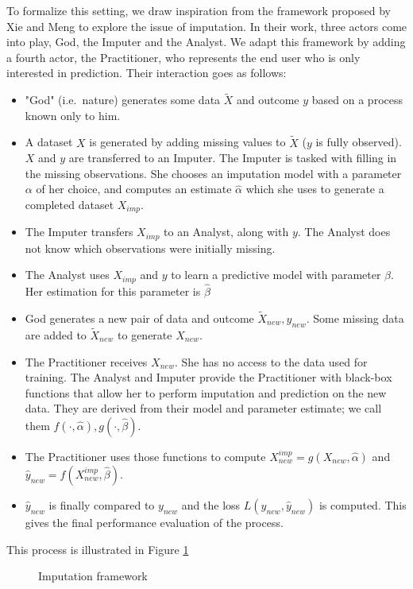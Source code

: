 To formalize this setting, we draw inspiration from the framework proposed by Xie and Meng \cite{xie2017framework} to explore the issue of imputation. In their work, three actors come into play, God, the Imputer and the Analyst. We adapt this framework by adding a fourth actor, the Practitioner, who represents the end user who is only interested in prediction. Their interaction goes as follows:
\begin{itemize}
 \item "God" (i.e.\ nature) generates some data $\tilde{X}$ and outcome $y$ based on a process known only to him. 
 \item A dataset $X$ is generated by adding missing values to $\tilde{X}$ ($y$ is fully observed). $X$ and $y$ are transferred to an Imputer. The Imputer is tasked with filling in the missing observations. She chooses an imputation model with a parameter $\alpha$ of her choice, and computes an estimate $\hat{\alpha}$ which she uses to generate a completed dataset $X_{imp}$.
 \item The Imputer transfers $X_{imp}$ to an Analyst, along with $y$. The Analyst does not know which observations were initially missing.
 \item The Analyst uses $X_{imp}$ and $y$ to learn a predictive model with parameter $\beta$. Her estimation for this parameter is $\hat{\beta}$
 \item God generates a new pair of data and outcome $\tilde{X}_{new}, y_{new}$. Some missing data are added to
 $\tilde{X}_{new}$ to generate $X_{new}$.
 \item The Practitioner receives $X_{new}$. She has no access to the data used for training. The Analyst and Imputer provide the Practitioner with black-box functions that allow her to perform imputation and prediction on the new data. They are derived from their model and parameter estimate; we call them $f(\cdot,\hat{\alpha}),g(\cdot,\hat{\beta})$.
 \item The Practitioner uses those functions to compute $X_{new}^{imp} = g(X_{new},\hat{\alpha})$ and $\hat{y}_{new}= f(X_{new}^{imp},\hat{\beta})$.
 \item $\hat{y}_{new}$ is finally compared to $y_{new}$ and the loss $L(y_{new}, \hat{y}_{new})$ is computed. This gives the final performance evaluation of the process.
\end{itemize}

This process is illustrated in Figure \ref{fig.tikz_imp}

\begin{figure}[H]
 \caption{Imputation framework}
 \label{fig.tikz_imp}
\end{figure}

